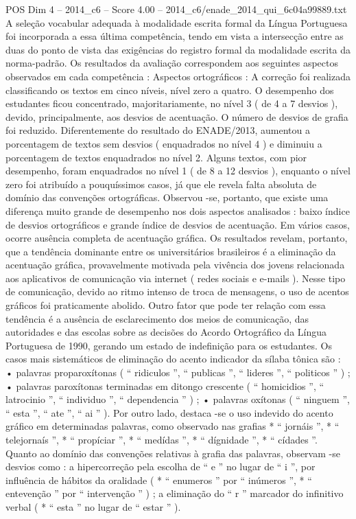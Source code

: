 \begin{textsample}{POS Dim 4 – 2014\_c6 – Score 4.00 – 2014\_c6/enade\_2014\_qui\_6c04a99889.txt}
A seleção vocabular adequada à modalidade escrita formal da Língua Portuguesa foi incorporada a essa última competência, tendo em vista a intersecção entre as duas do ponto de vista das exigências do registro formal da modalidade escrita da norma-padrão.
Os resultados da avaliação correspondem aos seguintes aspectos observados em cada competência : Aspectos ortográficos : A correção foi realizada classificando os textos em cinco níveis, nível zero a quatro.
O desempenho dos estudantes ficou concentrado, majoritariamente, no nível 3 ( de 4 a 7 desvios ), devido, principalmente, aos desvios de acentuação.
O número de desvios de grafia foi reduzido.
Diferentemente do resultado do ENADE/2013, aumentou a porcentagem de textos sem desvios ( enquadrados no nível 4 ) e diminuiu a porcentagem de textos enquadrados no nível 2.
Alguns textos, com pior desempenho, foram enquadrados no nível 1 ( de 8 a 12 desvios ), enquanto o nível zero foi atribuído a pouquíssimos casos, já que ele revela falta absoluta de domínio das convenções ortográficas.
Observou -se, portanto, que existe uma diferença muito grande de desempenho nos dois aspectos analisados : baixo índice de desvios ortográficos e grande índice de desvios de acentuação.
Em vários casos, ocorre ausência completa de acentuação gráfica.
Os resultados revelam, portanto, que a tendência dominante entre os universitários brasileiros é a eliminação da acentuação gráfica, provavelmente motivada pela vivência dos jovens relacionada aos aplicativos de comunicação via internet ( redes sociais e e-mails ).
Nesse tipo de comunicação, devido ao ritmo intenso de troca de mensagens, o uso de acentos gráficos foi praticamente abolido.
Outro fator que pode ter relação com essa tendência é a ausência de esclarecimento dos meios de comunicação, das autoridades e das escolas sobre as decisões do Acordo Ortográfico da Língua Portuguesa de 1990, gerando um estado de indefinição para os estudantes.
Os casos mais sistemáticos de eliminação do acento indicador da sílaba tônica são : • palavras proparoxítonas ( “ ridiculos ”, “ publicas ”, “ lideres ”, “ politicos ” ) ; • palavras paroxítonas terminadas em ditongo crescente ( “ homicidios ”, “ latrocinio ”, “ individuo ”, “ dependencia ” ) ; • palavras oxítonas ( “ ninguem ”, “ esta ”, “ ate ”, “ ai ” ).
Por outro lado, destaca -se o uso indevido do acento gráfico em determinadas palavras, como observado nas grafias * “ jornáis ”, * “ telejornaís ”, * “ propíciar ”, * “ medídas ”, * “ dígnidade ”, * “ cídades ”.
Quanto ao domínio das convenções relativas à grafia das palavras, observam -se desvios como : a hipercorreção pela escolha de “ e ” no lugar de “ i ”, por influência de hábitos da oralidade ( * “ enumeros ” por “ inúmeros ”, * “ entevenção ” por “ intervenção ” ) ; a eliminação do “ r ” marcador do infinitivo verbal ( * “ esta ” no lugar de “ estar ” ).

\end{textsample}

